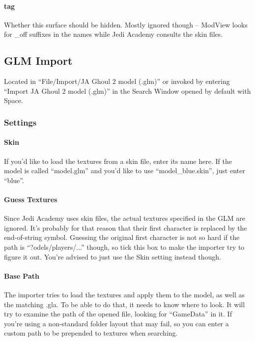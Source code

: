 \documentclass[a4paper,10pt]{article}
\begin{document}
 \paragraph*{tag}
 Whether this surface should be hidden. Mostly ignored though -- ModView looks for \_off suffixes in the names
 while Jedi Academy consults the skin files.
 
 
 \subsection{GLM Import}
 
 Located in ``File/Import/JA Ghoul 2 model (.glm)'' or invoked by entering ``Import JA Ghoul 2 model (.glm)''
 in the Search Window opened by default with Space.
 
 \subsubsection*{Settings}
 
 \paragraph*{Skin}
 If you'd like to load the textures from a skin file, enter its name here. If the model is called ``model.glm''
 and you'd like to use ``model\_blue.skin'', just enter ``blue''.
 
 \paragraph*{Guess Textures}
 Since Jedi Academy uses skin files, the actual textures specified in the GLM are ignored. It's probably for
 that reason that their first character is replaced by the end-of-string symbol. Guessing the original first
 character is not so hard if the path is ``?odels/players/...'' though, so tick this box to make the importer
 try to figure it out. You're advised to just use the Skin setting instead though.
 
 \paragraph*{Base Path}
 The importer tries to load the textures and apply them to the model, as well as the matching .gla. To be able
 to do that, it needs to know where to look. It will try to examine the path of the opened file, looking for
 ``GameData'' in it. If you're using a non-standard folder layout that may fail, so you can enter a custom path
 to be prepended to textures when searching.
 
\end{document}
